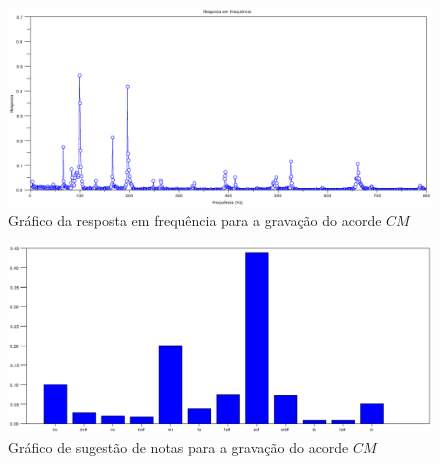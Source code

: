 \begin{figure}[h]
	\centering
		\includegraphics[keepaspectratio=true,scale=0.49]{figuras/CM/fft_cm.eps}
	\caption{Gráfico da resposta em frequência para a gravação do acorde $CM$}
  \label{fig:espectro_CM}
\end{figure}

\begin{figure}[h]
	\centering
		\includegraphics[keepaspectratio=true,scale=0.49]{figuras/CM/notas_cm.eps}
	\caption{Gráfico de sugestão de notas para a gravação do acorde $CM$}
  \label{fig:notas_CM}
\end{figure}

